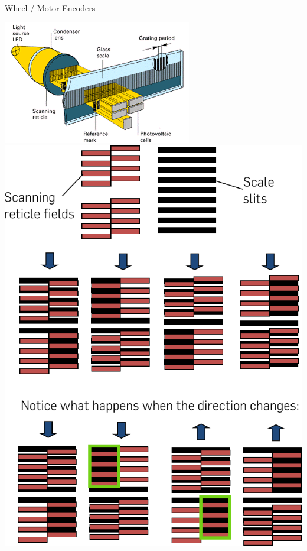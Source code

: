 \documentclass[compress]{beamer}
\begin{document}
\begin{frame}{Wheel / Motor Encoders}
    \centering

    \includegraphics[width=0.45\columnwidth]{encoders2}
    \includegraphics[width=0.45\columnwidth]{encoders}



\end{frame}
\end{document}
